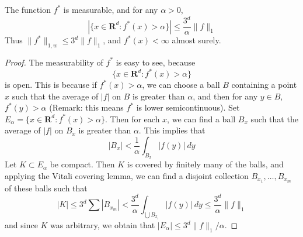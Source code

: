 \begin{theorem}
    The function $f^*$ is measurable, and for any $\alpha > 0$,
    \[ |\{ x \in \mathbf{R}^d: f^*(x) > \alpha \}| \leq \frac{3^d}{\alpha} \| f \|_1 \]
    Thus $\| f^* \|_{1,w} \leq 3^d \| f \|_1$, and $f^*(x) < \infty$ almost surely.
\end{theorem}
\begin{proof}
    The measurability of $f^*$ is easy to see, because
    \[ \{ x \in \mathbf{R}^d: f^*(x) > \alpha \} \]
    is open. This is because if $f^*(x) > \alpha$, we can choose a ball $B$ containing a point $x$ such that the average of $|f|$ on $B$ is greater than $\alpha$, and then for any $y \in B$, $f^*(y) > \alpha$ (Remark: this means $f^*$ is lower semicontinuous). Set $E_\alpha = \{ x \in \mathbf{R}^d: f^*(x) > \alpha \}$. Then for each $x$, we can find a ball $B_x$ such that the average of $|f|$ on $B_x$ is greater than $\alpha$. This implies that
    \[ |B_x| < \frac{1}{\alpha} \int_{B_x} |f(y)|\ dy \]
    Let $K \subset E_\alpha$ be compact. Then $K$ is covered by finitely many of the balls, and applying the Vitali covering lemma, we can find a disjoint collection $B_{x_1}, \dots, B_{x_m}$ of these balls such that
    \[ |K| \leq 3^d \sum |B_{x_m}| < \frac{3^d}{\alpha} \int_{\bigcup B_{x_i}} |f(y)|\ dy \leq \frac{3^d}{\alpha} \|f\|_1 \]
    and since $K$ was arbitrary, we obtain that $|E_\alpha| \leq 3^d \| f \|_1/\alpha$.
\end{proof}


